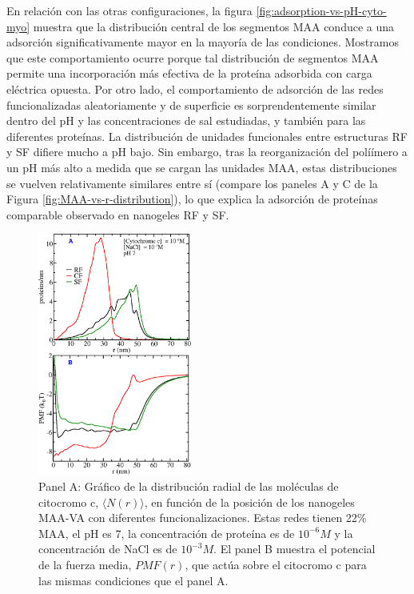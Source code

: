  En relaci\'on con las otras configuraciones, la figura \ref{fig:adsorption-vs-pH-cyto-myo} muestra que la distribuci\'on central de los segmentos MAA conduce a una adsorci\'on significativamente mayor en la mayor\'ia de las condiciones.
 Mostramos que este comportamiento ocurre porque tal distribuci\'on de segmentos MAA permite una incorporaci\'on m\'as efectiva de la prote\'ina adsorbida con carga el\'ectrica opuesta.
 Por otro lado, el comportamiento de adsorci\'on de las redes funcionalizadas aleatoriamente y de superficie es sorprendentemente similar dentro del pH y las concentraciones de sal estudiadas, y tambi\'en para las diferentes prote\'inas.
 La distribuci\'on de unidades funcionales entre estructuras RF y SF difiere mucho a pH bajo.
 Sin embargo, tras la reorganizaci\'on del polí\'imero a un pH m\'as alto a medida que se cargan las unidades MAA, estas distribuciones se vuelven relativamente similares entre s\'i (compare los paneles A y C de la Figura \ref{fig:MAA-vs-r-distribution}), lo que explica la adsorci\'on de prote\'inas comparable observado en nanogeles RF y SF.





\begin{figure}[!htb]
     \centering
     \includegraphics[width=0.45\textwidth]{Figures/graphs-gel2/cyto-adsr-pmf.png}
     \caption{Panel A: Gr\'afico de la distribuci\'on radial de las mol\'eculas de citocromo c, $\langle N(r)\rangle$, en funci\'on de la posici\'on de los nanogeles MAA-VA con diferentes funcionalizaciones.
     	Estas redes tienen 22\% MAA, el pH es 7, la concentraci\'on de prote\'ina es de $10^{-6}M$ y la concentraci\'on de NaCl es de $10^{-3}M$.
     	El panel B muestra el potencial de la fuerza media, ${PMF}(r)$, que act\'ua sobre el citocromo c para las mismas condiciones que el panel A.}
     \label{fig:adsorption-vs-r-cyto}
 \end{figure}



